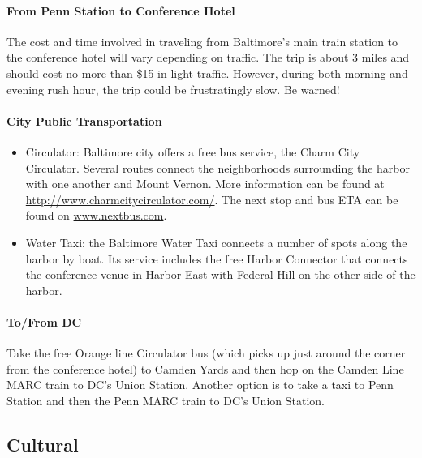\paragraph*{From Penn Station to Conference Hotel}
The cost and time involved in traveling from Baltimore's main train station to the conference hotel will vary depending on traffic. The trip is about 3 miles and should cost no more than \$15 in light traffic. However, during both morning and evening rush hour, the trip could be frustratingly slow. Be warned!

\paragraph*{City Public Transportation}
\begin{itemize}
\item{Circulator: Baltimore city offers a free bus service, the Charm City Circulator. Several routes connect the neighborhoods surrounding the harbor with one another and Mount Vernon. More information can be found at \url{http://www.charmcitycirculator.com/}. The next stop and bus ETA can be found on \url{www.nextbus.com}.}
\item{Water Taxi: the Baltimore Water Taxi connects a number of spots along the harbor by boat. Its service includes the free Harbor Connector that connects the conference venue in Harbor East with Federal Hill on the other side of the harbor.}
\end{itemize}

\paragraph*{To/From DC}
Take the free Orange line Circulator bus (which picks up just around the corner from the conference hotel) to Camden Yards and then hop on the Camden Line MARC train to DC's Union Station. Another option is to take a taxi to Penn Station and then the Penn MARC train to DC's Union Station. 

\subsection*{Cultural}

